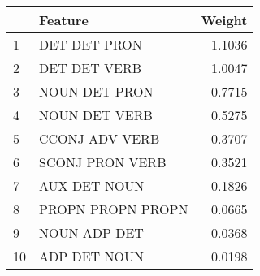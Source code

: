 \begin{tabular}{llr}
\toprule
{} &            Feature &  Weight \\
\midrule
1  &       DET DET PRON &  1.1036 \\
2  &       DET DET VERB &  1.0047 \\
3  &      NOUN DET PRON &  0.7715 \\
4  &      NOUN DET VERB &  0.5275 \\
5  &     CCONJ ADV VERB &  0.3707 \\
6  &    SCONJ PRON VERB &  0.3521 \\
7  &       AUX DET NOUN &  0.1826 \\
8  &  PROPN PROPN PROPN &  0.0665 \\
9  &       NOUN ADP DET &  0.0368 \\
10 &       ADP DET NOUN &  0.0198 \\
\bottomrule
\end{tabular}
